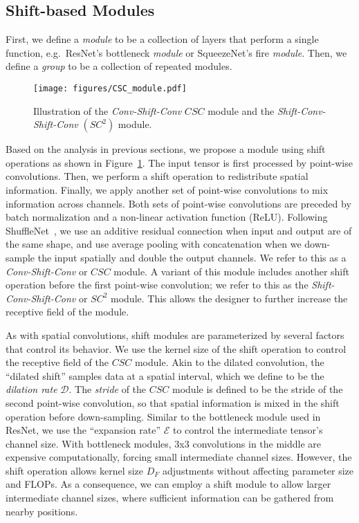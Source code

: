 \documentclass[10pt,twocolumn,letterpaper]{article}
\begin{document}
\subsection{Shift-based Modules}

First, we define a \textit{module} to be a collection of layers that perform a single function, e.g.~ResNet's bottleneck \textit{module} or SqueezeNet's fire \textit{module}. Then, we define a \textit{group} to be a collection of repeated modules.

\begin{figure}[th]
\centering
\texttt{[image: figures/CSC\_module.pdf]}
   \caption{Illustration of the \textit{Conv-Shift-Conv} $CSC$ module and the \textit{Shift-Conv-Shift-Conv} $(SC^2)$ module.}
\label{fig:CSC}
\end{figure}

Based on the analysis in previous sections, we propose a module using shift operations as shown in Figure~\ref{fig:CSC}. The input tensor is first processed by point-wise convolutions. Then, we perform a shift operation to redistribute spatial information. Finally, we apply another set of point-wise convolutions to mix information across channels. Both sets of point-wise convolutions are preceded by batch normalization and a non-linear activation function (ReLU). Following ShuffleNet~\cite{ShuffleNet}, we use an additive residual connection when input and output are of the same shape, and use average pooling with concatenation when we down-sample the input spatially and double the output channels. We refer to this as a \textit{Conv-Shift-Conv} or $CSC$ module. A variant of this module includes another shift operation before the first point-wise convolution; we refer to this as the \textit{Shift-Conv-Shift-Conv} or $SC^2$ module. This allows the designer to further increase the receptive field of the module. 

As with spatial convolutions, shift modules are parameterized by several factors that control its behavior. We use the kernel size of the shift operation to control the receptive field of the $CSC$ module. Akin to the dilated convolution, the ``dilated shift'' samples data at a spatial interval, which we define to be the \textit{dilation rate} $\mathcal{D}$. The \textit{stride} of the $CSC$ module is defined to be the stride of the second point-wise convolution, so that spatial information is mixed in the shift operation before down-sampling. Similar to the bottleneck module used in ResNet, we use the ``expansion rate'' $\mathcal{E}$ to control the intermediate tensor's channel size. With bottleneck modules, 3x3 convolutions in the middle are expensive computationally, forcing small intermediate channel sizes. However, the shift operation allows kernel size $D_F$ adjustments without affecting parameter size and FLOPs. As a consequence, we can employ a shift module to allow larger intermediate channel sizes, where sufficient information can be gathered from nearby positions.
\end{document}
